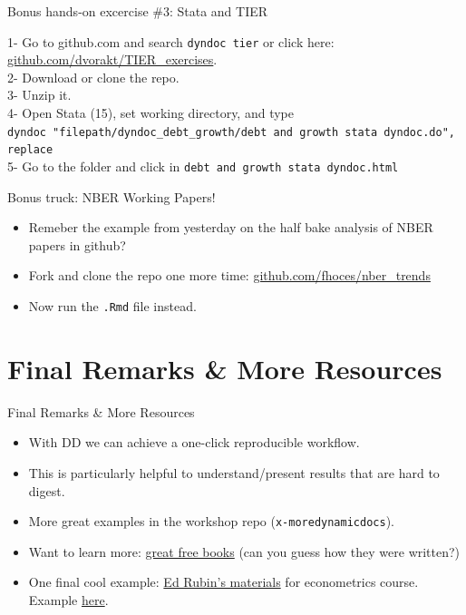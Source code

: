 \documentclass[ignorenonframetext,]{beamer}
\providecommand{\tightlist}{%
  \setlength{\itemsep}{0pt}\setlength{\parskip}{0pt}}
\begin{document}
\begin{frame}[fragile]{Bonus hands-on excercise \#3: Stata and TIER}
\protect\hypertarget{bonus-hands-on-excercise-3-stata-and-tier}{}

1- Go to github.com and search \texttt{dyndoc\ tier} or click here:
\href{https://github.com/dvorakt/TIER_exercises}{github.com/dvorakt/TIER\_exercises}.\\
2- Download or clone the repo.\\
3- Unzip it.\\
4- Open Stata (15), set working directory, and type
\texttt{dyndoc\ "filepath/dyndoc\_debt\_growth/debt\ and\ growth\ stata\ dyndoc.do",\ replace}\\
5- Go to the folder and click in
\texttt{debt\ and\ growth\ stata\ dyndoc.html}

\end{frame}

\begin{frame}[fragile]{Bonus truck: NBER Working Papers!}
\protect\hypertarget{bonus-truck-nber-working-papers}{}

\begin{itemize}
\item
  Remeber the example from yesterday on the half bake analysis of NBER
  papers in github?
\item
  Fork and clone the repo one more time:
  \href{https://github.com/fhoces/nber_trends}{github.com/fhoces/nber\_trends}
\item
  Now run the \texttt{.Rmd} file instead.
\end{itemize}

\end{frame}

\hypertarget{final-remarks-more-resources}{%
\section{Final Remarks \& More
Resources}\label{final-remarks-more-resources}}

\begin{frame}[fragile]{Final Remarks \& More Resources}
\protect\hypertarget{final-remarks-more-resources-1}{}

\begin{itemize}
\tightlist
\item
  With DD we can achieve a one-click reproducible workflow.
\item
  This is particularly helpful to understand/present results that are
  hard to digest.
\item
  More great examples in the workshop repo (\texttt{x-moredynamicdocs}).
\item
  Want to learn more: \href{https://bookdown.org/}{great free books}
  (can you guess how they were written?)
\item
  One final cool example: \href{http://edrub.in/teaching.html}{Ed
  Rubin's materials} for econometrics course. Example
  \href{https://raw.githack.com/edrubin/EC525S19/master/NotesLecture/03WhyRegression/03WhyRegression.html}{here}.
\end{itemize}

\end{frame}
\end{document}
